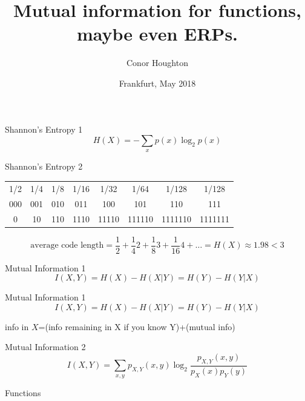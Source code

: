 \documentclass{beamer}
\title[Mutual information for functions.]{Mutual information for functions, maybe even ERPs.}
\author{Conor Houghton}
\institute{CS, U Bristol}
\date{Frankfurt, May 2018}
\begin{document}
\maketitle



\begin{frame}{Shannon's Entropy 1}
\color{dark}
$$
H(X)=-\sum_x p(x)\log_2{p(x)}
$$
\color{black}
\end{frame}



\begin{frame}{Shannon's Entropy 2}
\color{black}
\begin{center}
\begin{tabular}{cccccccc}
1/2&1/4&1/8&1/16&1/32&1/64&1/128&1/128\\
000&001&010&011&100&101&110&111\\
0&10&110&1110&11110&111110&1111110&1111111
\end{tabular}
\end{center}
\color{dark}
$$
\mbox{average code length}=\frac{1}{2}+\frac{1}{4}2+\frac{1}{8}3+\frac{1}{16}4+\ldots = H(X)\approx 1.98 < 3
$$
\color{black}
\end{frame}


\begin{frame}{Mutual Information 1}
\color{dark}
$$
I(X,Y)=H(X)-H(X|Y)=H(Y)-H(Y|X)
$$
\color{black}
\end{frame}


\begin{frame}{Mutual Information 1}
\color{dark}
$$
I(X,Y)=H(X)-H(X|Y)=H(Y)-H(Y|X)
$$
\color{black}
\begin{center}
info in $X$=(info remaining in X if you know Y)+(mutual info)
\end{center}
\end{frame}

\begin{frame}{Mutual Information 2}
\color{dark}
$$
I(X,Y)=\sum_{x,y} p_{X,Y}(x,y) \log_2{\frac{p_{X,Y}(x,y)}{p_X(x)p_Y(y)}}
$$
\color{black}
\end{frame}

\begin{frame}{Functions}
\color{reddish}
\begin{center}

\end{center}
\end{frame}
\end{document}
